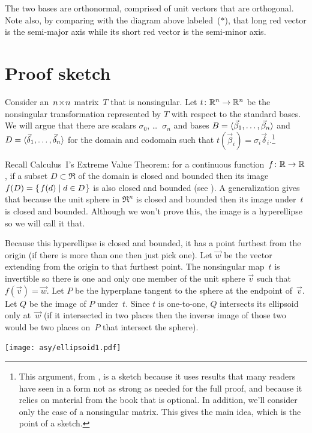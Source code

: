 The two bases are orthonormal,
comprised of unit vectors that are orthogonal.
Note also, by comparing with the diagram above labeled~($*$), that
long red vector is the
semi-major axis while its short red vector is the  
semi-minor axis.



\section{Proof sketch}

Consider an~$n \! \times \! n$ matrix~$T$ that is nonsingular.
Let $\mbox{$t\colon \mathbb{R}^n\to \mathbb{R}^n$}$ be the
nonsingular transformation represented by
$T$ with respect to the standard bases.
We will argue that there are scalars $\sigma_0$, \ldots~$\sigma_n$
and bases
$B=\langle\vec{\beta}_1,\ldots,\vec{\beta}_n\rangle$ and
$D=\langle\vec{\delta}_1,\ldots,\vec{\delta}_n\rangle$ for the 
domain and codomain
such that $t(\vec{\beta}_i)=\sigma_i\vec{\delta}_i.$\footnote{%
  This argument, 
  from \protect\cite{BlankKrikorianSpring89},
  is a sketch because it uses results that many readers have 
  seen in a form not as strong as needed for the full proof, 
  and because it relies on material from the book that is optional.
  In addition, we'll consider only the case of a nonsingular matrix.
  This gives the main idea, which is the point of a sketch.}

Recall Calculus~I's Extreme Value Theorem: for a continuous
function~$\mbox{$f\colon \mathbb{R}\to \mathbb{R}$}$, if a subset $D\subset \Re$ of the domain 
is closed and bounded then
its image $f(D)=\mbox{$\{\hspace{0.1em}f(d)\mid d\in D\hspace{0.1em}\}$}$ 
is also closed and bounded (see \cite{wiki:ExtremeValueThm}).
A generalization gives that because the unit sphere in $\Re^n$
is closed and bounded then its image under~$t$ is closed and bounded.
Although we won't prove this, the image is a hyperellipse
so we will call it that. 

Because this hyperellipse is closed and bounded, it has a 
point furthest from the origin (if there is more than one then just pick one).
Let $\vec{w}$ be the vector extending from the origin to that furthest point.
The nonsingular map~$t$ is invertible so there is one and only one
member of the unit sphere $\vec{v}$ such that $f(\vec{v})=\vec{w}$.
Let $P$ be the hyperplane tangent to the sphere at the endpoint of~$\vec{v}$.
Let $Q$ be the image of $P$ under~$t$.
Since $t$ is one-to-one, $Q$ intersects its ellipsoid only at~$\vec{w}$
(if it intersected in two places then the inverse image of those two would be
two places on~$P$ that intersect the sphere).
\begin{center}
  \texttt{[image: asy/ellipsoid1.pdf]}
\end{center}

